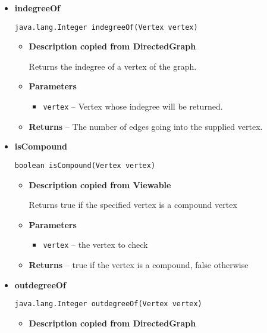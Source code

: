 {{{{{{{{{{{{{{{\begin{itemize}
{\begin{itemize}
{Returns a set of all incoming edges of a vertex.
}
\item{
{\bf  Parameters}
  \begin{itemize}
   \item{
\texttt{vertex} -- Vertex whose incoming edges will be returned.}
  \end{itemize}
}%
\item{{\bf  Returns} -- 
The edges coming in the supplied vertex. 
}%
\end{itemize}
}%
\item{ 
{\bf  indegreeOf}\\
\begin{lstlisting}[frame=none]
java.lang.Integer indegreeOf(Vertex vertex)\end{lstlisting} %
\begin{itemize}
\item{
{\bf  Description copied from DirectedGraph{\small {}} }

Returns the indegree of a vertex of the graph.
}
\item{
{\bf  Parameters}
  \begin{itemize}
   \item{
\texttt{vertex} -- Vertex whose indegree will be returned.}
  \end{itemize}
}%
\item{{\bf  Returns} -- 
The number of edges going into the supplied vertex. 
}%
\end{itemize}
}%
\item{ 
{\bf  isCompound}\\
\begin{lstlisting}[frame=none]
boolean isCompound(Vertex vertex)\end{lstlisting} %
\begin{itemize}
\item{
{\bf  Description copied from Viewable{\small {}} }

Returns true if the specified vertex is a compound vertex
}
\item{
{\bf  Parameters}
  \begin{itemize}
   \item{
\texttt{vertex} -- the vertex to check}
  \end{itemize}
}%
\item{{\bf  Returns} -- 
true if the vertex is a compound, false otherwise 
}%
\end{itemize}
}%
\item{ 
{\bf  outdegreeOf}\\
\begin{lstlisting}[frame=none]
java.lang.Integer outdegreeOf(Vertex vertex)\end{lstlisting} %
\begin{itemize}
\item{
{\bf  Description copied from DirectedGraph{\small {}} }

}
\end{itemize}}
\end{itemize}}}}}}}}}}}}}}}}
